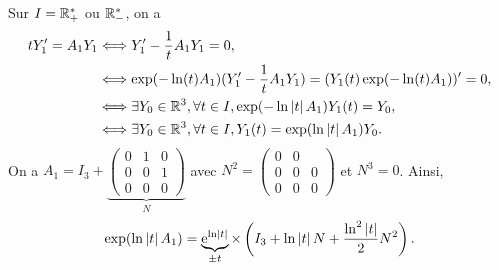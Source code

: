 \documentclass[12pt]{article}
\begin{document}
\begin{remark}
	Sur $I=\mathbb{R}_{+}^{*}$ ou $\mathbb{R}_{-}^{*}$, on a 
	\begin{align*}
		tY_1'=A_1Y_1
		&\Longleftrightarrow Y_1'-\frac{1}{t}A_1Y_1=0,\\
		&\Longleftrightarrow \exp(-\ln(t)A_1)(Y_1'-\frac{1}{t}A_1 Y_1)=(Y_1(t)\exp(-\ln(t)A_1))'=0,\\
		&\Longleftrightarrow \exists Y_0\in\mathbb{R}^{3}, \forall t\in I, \exp(-\ln\left\lvert t\right\rvert A_1)Y_1(t)=Y_0,\\
		&\Longleftrightarrow \exists Y_0\in\mathbb{R}^{3}, \forall t\in I, Y_1(t)=\exp(\ln\left\lvert t\right\rvert A_1)Y_0.
	\end{align*}
	On a $A_1=I_3+\underbrace{
		\begin{pmatrix}
			0&1&0\\0&0&1\\0&0&0
		\end{pmatrix}
	}_{N}$ avec $N^{2}=
	\begin{pmatrix}
		0&0&\\0&0&0\\0&0&0
	\end{pmatrix}$ et $N^{3}=0$. Ainsi, 
	\begin{equation*}
		\exp(\ln\left\lvert t\right\rvert A_1)=\underbrace{\mathrm{e}^{\ln\left\lvert t\right\rvert}}_{\pm t}\times\left(I_3+\ln\left\lvert t\right\rvert N+\frac{\ln^{2}\left\lvert t\right\rvert}{2}N^{2}\right).
	\end{equation*}
\end{remark}
\end{document}
